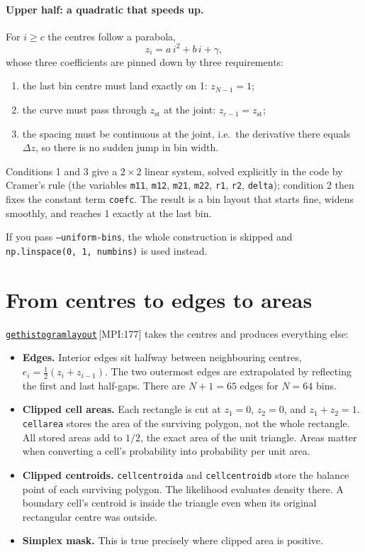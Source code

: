 \documentclass[11pt,a4paper]{report}
\newcommand{\srcbase}{vscode://file/Users/syellapa/Documents/Research/2026/ANSYS/Multi-ScalarPDF}
\newcommand{\srctag}[1]{{\footnotesize\textcolor{TagGray}{[#1]}}}
\newcommand{\Mpi}[2]{\href{\srcbase/EnsightPDFHybridDatasetMPI.py:#1}{\texttt{#2}}\,\srctag{MPI:#1}}
\newcommand{\code}[1]{\texttt{#1}}
\renewcommand{\_}{\origtextunderscore\allowbreak}
\begin{document}
\paragraph{Upper half: a quadratic that speeds up.}
For $i \ge c$ the centres follow a parabola,
\[
  z_i = a\,i^2 + b\,i + \gamma ,
\]
whose three coefficients are pinned down by three requirements:
\begin{enumerate}
  \item the last bin centre must land exactly on 1: \quad $z_{N-1} = 1$;
  \item the curve must pass through $z_{\text{st}}$ at the joint: \quad $z_{c-1} = z_{\text{st}}$;
  \item the spacing must be continuous at the joint, i.e.\ the derivative there equals
        $\Delta z$, so there is no sudden jump in bin width.
\end{enumerate}
Conditions 1 and 3 give a $2\times2$ linear system, solved explicitly in the code by Cramer's
rule (the variables \code{m11}, \code{m12}, \code{m21}, \code{m22}, \code{r1}, \code{r2},
\code{delta}); condition 2 then fixes the constant term \code{coef\_c}. The result is a bin
layout that starts fine, widens smoothly, and reaches 1 exactly at the last bin.

If you pass \code{--uniform-bins}, the whole construction is skipped and
\code{np.linspace(0, 1, num\_bins)} is used instead.

\section{From centres to edges to areas}

\Mpi{177}{get\_histogram\_layout} takes the centres and produces everything else:

\begin{itemize}
  \item \textbf{Edges.} Interior edges sit halfway between neighbouring centres,
        $e_i = \tfrac{1}{2}(z_i + z_{i-1})$. The two outermost edges are extrapolated by
        reflecting the first and last half-gaps. There are $N+1 = 65$ edges for $N = 64$ bins.
  \item \textbf{Clipped cell areas.} Each rectangle is cut at $z_1=0$, $z_2=0$, and
        $z_1+z_2=1$.  \code{cell\_area} stores the area of the surviving polygon, not the
        whole rectangle.  All stored areas add to $1/2$, the exact area of the unit triangle.
        Areas matter when converting a cell's probability into probability per unit area.
  \item \textbf{Clipped centroids.} \code{cell\_centroid\_a} and
        \code{cell\_centroid\_b} store the balance point of each surviving polygon.  The
        likelihood evaluates density there.  A boundary cell's centroid is inside the
        triangle even when its original rectangular centre was outside.
  \item \textbf{Simplex mask.} This is true precisely where clipped area is positive.
\end{itemize}
\end{document}
